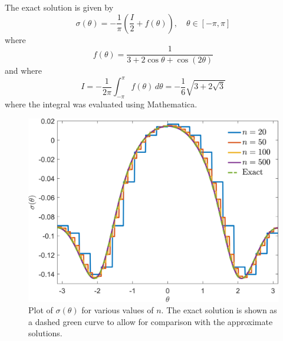 \documentclass[11pt]{article}
\begin{document}
The exact solution is given by
\begin{equation}
  \sigma(\theta) = -\frac{1}{\pi} \left( \frac{I}{2} + f(\theta) \right), \quad \theta \in [-\pi, \pi]
\end{equation}
where 
\begin{equation}
  f(\theta) = \frac{1}{3 + 2\cos\theta + \cos(2\theta)}
\end{equation}
and where
\begin{equation*}
  I = - \frac{1}{2\pi} \int_{-\pi}^\pi f(\theta) \, d\theta
  = -\frac{1}{6} \sqrt{3 + 2\sqrt{3}}
\end{equation*}
where the integral was evaluated using Mathematica.

\begin{figure}[!htb]
  \centering
  \includegraphics[width=\linewidth]{sigma_solution.png}
  \caption{Plot of $\sigma(\theta)$ for various values of $n$. The exact solution is shown as a dashed green curve to allow for comparison with the approximate solutions.}
  \label{fig:sigma_solution}
\end{figure}
\end{document}
